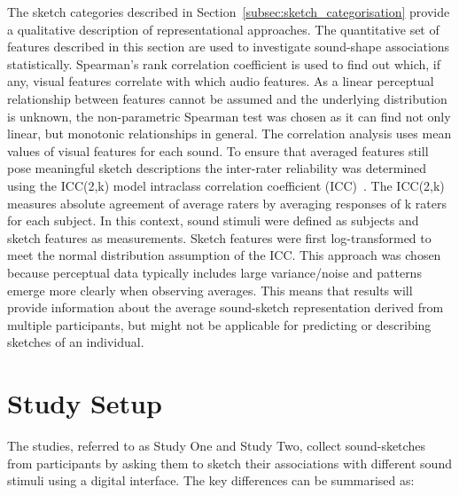 \documentclass[]{interact}
\theoremstyle{plain}%
\theoremstyle{definition}
\theoremstyle{remark}
\begin{document}
The sketch categories described in Section~\ref{subsec:sketch_categorisation} provide a qualitative description of representational approaches. The quantitative set of features described in this section are used to investigate sound-shape associations statistically. Spearman's rank correlation coefficient is used to find out which, if any, visual features correlate with which audio features. As a linear perceptual relationship between features cannot be assumed and the underlying distribution is unknown, the non-parametric Spearman test was chosen as it can find not only linear, but monotonic relationships in general. The correlation analysis uses mean values of visual features for each sound. To ensure that averaged features still pose meaningful sketch descriptions the inter-rater reliability was determined using the ICC(2,k) model intraclass correlation coefficient (ICC)~\cite{koo2016guideline}. The ICC(2,k) measures absolute agreement of average raters by averaging responses of k raters for each subject. In this context, sound stimuli were defined as subjects and sketch features as measurements. Sketch features were first log-transformed to meet the normal distribution assumption of the ICC. This approach was chosen because perceptual data typically includes large variance/noise and patterns emerge more clearly when observing averages. This means that results will provide information about the average sound-sketch representation derived from multiple participants, but might not be applicable for predicting or describing sketches of an individual.   




\section{Study Setup}\label{sec:study_setup}

The studies, referred to as Study One and Study Two, collect sound-sketches from participants by asking them to sketch their associations with different sound stimuli using a digital interface. The key differences can be summarised as:
\end{document}
